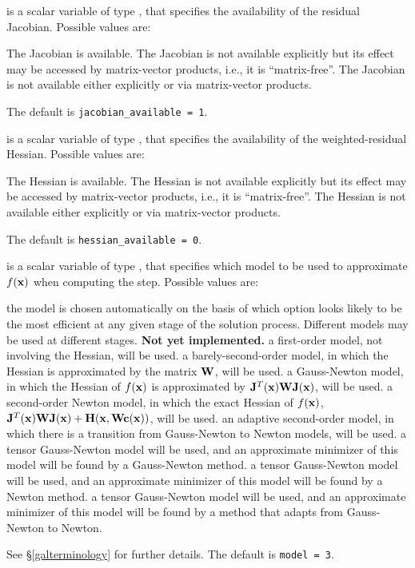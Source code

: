 \documentclass{galahad}
\begin{document}
\begin{description}
 is a scalar variable of type \integer,
that specifies the availability of the residual Jacobian.
Possible values are:

\begin{description}
 The Jacobian is available.
 The Jacobian is not available explicitly but its effect
may be accessed by matrix-vector products, i.e., it is ``matrix-free''.
 The Jacobian is not available either explicitly or via
matrix-vector products.
\end{description}
The default is {\tt jacobian\_available = 1}.

 is a scalar variable of type \integer,
that specifies the availability of the weighted-residual Hessian.
Possible values are:

\begin{description}
 The Hessian is available.
 The Hessian is not available explicitly but its effect
may be accessed by matrix-vector products, i.e., it is ``matrix-free''.
 The Hessian is not available either explicitly or via
matrix-vector products.
\end{description}
The default is {\tt hessian\_available = 0}.

 is a scalar variable of type \integer, that specifies
which model to be used to approximate $f({\mathbf{x}})$ when computing the step.
Possible values are:

\begin{description}
 the model is chosen automatically on the basis of which option
        looks likely to be the most efficient at any given stage of the
        solution process. Different models may be used at different stages.
        {\bf Not yet implemented.}
 a first-order model, not involving the Hessian, will be used.
 a barely-second-order model, in which the Hessian is approximated
        by the matrix ${\mathbf{W}}$, will be used.
 a Gauss-Newton model, in which the Hessian of $f({\mathbf{x}})$
        is approximated by ${\mathbf{J}}^T({\mathbf{x}}) {\mathbf{W}} {\mathbf{J}}({\mathbf{x}})$, will be used.
 a second-order Newton model, in which the exact Hessian of $f({\mathbf{x}})$,
${\mathbf{J}}^T({\mathbf{x}}) {\mathbf{W}} {\mathbf{J}}({\mathbf{x}}) + {\mathbf{H}}({\mathbf{x}},{\mathbf{W}} {\mathbf{c}}({\mathbf{x}}))$,
will be used.
 an adaptive second-order model, in which there is a transition from
         Gauss-Newton to Newton models, will be used.
 a tensor Gauss-Newton model will be used, and an approximate minimizer
of this model will be found by a Gauss-Newton method.
 a tensor Gauss-Newton model will be used, and an approximate minimizer
of this model will be found by a Newton method.
 a tensor Gauss-Newton model will be used, and an approximate
 minimizer
of this model will be found by a method that adapts from Gauss-Newton to Newton.
\end{description}
See \S\ref{galterminology} for further details.
The default is {\tt model = 3}.


\end{description}
\end{document}
